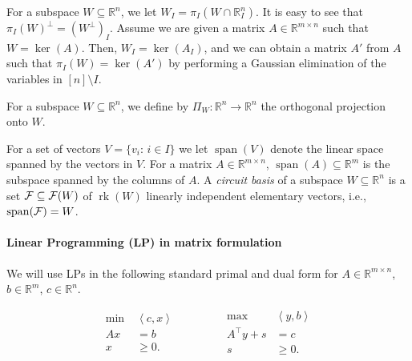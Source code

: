 \documentclass[11pt, a4paper]{article}
\newcommand{\pr}[2]{\left\langle #1, #2 \right\rangle}
\newcommand{\1}{\mathbbm{1}}
\newcommand{\rk}{\operatorname{rk}}
\newcommand{\spn}{\operatorname{span}}
\newcommand{\EE}{\mathcal F}
\theoremstyle{case}
\newcommand{\R}{\mathbb{R}}
\begin{document}
For a subspace $W\subseteq \R^n$, we let $W_I=\pi_I(W\cap \R^n_I)$. It is easy to see that $\pi_I(W)^\perp = (W^\perp)_I$. 
Assume we are given a matrix $A\in \R^{m\times n}$ such that $W=\ker(A)$. Then, $W_I=\ker(A_I)$, and we can obtain a matrix $A'$ from $A$ such that $\pi_I(W)=\ker(A')$ by performing a Gaussian elimination of the variables in $[n]\setminus I$.

For a subspace $W \subseteq \R^n$, we define by $\Pi_W\colon \R^n \to \R^n$ the orthogonal projection onto $W$.

For a set of vectors $V=\{v_i:\,  i\in I\}$ we let $\spn(V)$ denote the linear space spanned by the vectors in $V$. For a matrix $A\in\R^{m\times n}$, $\spn(A)\subseteq\R^{m}$ is the subspace spanned by the columns of $A$.
A \emph{circuit basis} of a subspace $W\subseteq \R^n$ is a set ${\cal F}\subseteq {\EE}(W)$ of $\rk(W)$ linearly independent elementary vectors, i.e., $\spn({\cal F})=W$.

\paragraph{Linear Programming (LP) in matrix formulation} We will use LPs in the following standard primal and dual form for $A\in\R^{m\times n}$, $b\in \R^m$, $c\in \R^n$. 

\begin{equation}
  \label{LP_primal_dual} \tag{LP$(A,b,c)$}
  \begin{aligned}
  \min \; &\pr{c}{x} \quad \\
  Ax& =b \\
  x &\geq 0. \\
  \end{aligned}
  \quad\quad\quad
  \begin{aligned}
  \max \; & \pr{y}{b} \\
  A^\top y + s &= c \\
  s & \geq 0. \\
  \end{aligned}
\end{equation}
\end{document}

